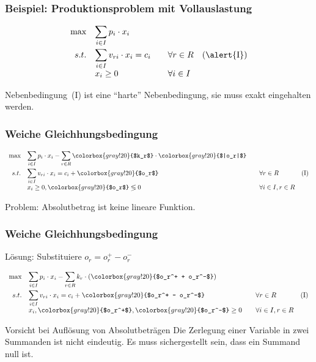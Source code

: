 \begin{frame}
 \frametitle{Beispiel: Produktionsproblem mit Vollauslastung}
 \begin{equation*}
  \begin{array}{rllr}
    \max & \displaystyle\sum_{i\in I} p_i\cdot x_i & & \\[3ex]
    s.t. & \displaystyle\sum_{i\in I} v_{ri}\cdot x_i = c_i & \quad\forall r\in R & \mathrm{(\alert{I})}\\
	  & x_i \geq 0 & \quad\forall i\in I & \\
  \end{array}
 \end{equation*}
 
 Nebenbedingung~\textrm{(\alert{I})} ist eine "`harte"' Nebenbedingung, sie muss exakt eingehalten werden.
\end{frame}

\begin{frame}
 \frametitle{Weiche Gleichhungsbedingung}
  \begin{equation*}
    \begin{array}{rllr}
      \max & \displaystyle\sum_{i\in I} p_i\cdot x_i - \sum_{r\in R} \colorbox{gray!20}{$k_r$} \cdot \colorbox{gray!20}{$|o_r|$} & & \\[3ex]
      s.t. & \displaystyle\sum_{i\in I} v_{ri}\cdot x_i = c_i + \colorbox{gray!20}{$o_r$} & \quad\forall r\in R & \mathrm{(I)}\\
	    & x_i \geq 0, \colorbox{gray!20}{$o_r$} \lessgtr0 & \quad\forall i\in I, r\in R & \\
    \end{array}
  \end{equation*}
 
 Problem: Absolutbetrag ist keine lineare Funktion.
\end{frame}

\begin{frame}
 \frametitle{Weiche Gleichhungsbedingung}
  Lösung: Substituiere $o_r = o_r^+ - o_r^-$
  
  \begin{equation*}
    \begin{array}{rllr}
      \max & \displaystyle\sum_{i\in I} p_i\cdot x_i - \sum_{r\in R} k_r \cdot (\colorbox{gray!20}{$o_r^+ + o_r^-$}) & & \\[3ex]
      s.t. & \displaystyle\sum_{i\in I} v_{ri}\cdot x_i = c_i + \colorbox{gray!20}{$o_r^+ - o_r^-$} & \quad\forall r\in R & \mathrm{(I)}\\
	    & x_i, \colorbox{gray!20}{$o_r^+$}, \colorbox{gray!20}{$o_r^-$} \geq 0 & \quad\forall i\in I, r\in R & \\
    \end{array}
  \end{equation*}
  
  \begin{alertblock}{Vorsicht bei Auflösung von Absolutbeträgen}
   Die Zerlegung einer Variable in zwei Summanden ist nicht eindeutig. Es muss sichergestellt sein, dass ein Summand null ist.
  \end{alertblock}
\end{frame}

